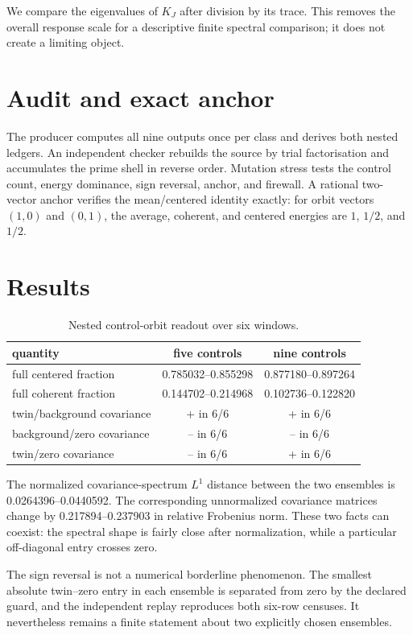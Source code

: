 \documentclass[10pt]{article}
\begin{document}
We compare the eigenvalues of $K_J$ after division by its trace.  This removes
the overall response scale for a descriptive finite spectral comparison; it
does not create a limiting object.

\section{Audit and exact anchor}

The producer computes all nine outputs once per class and derives both nested
ledgers.  An independent checker rebuilds the source by trial factorisation
and accumulates the prime shell in reverse order.  Mutation stress tests the
control count, energy dominance, sign reversal, anchor, and firewall.  A
rational two-vector anchor verifies the mean/centered identity exactly:
for orbit vectors $(1,0)$ and $(0,1)$, the average, coherent, and centered
energies are $1$, $1/2$, and $1/2$.

\section{Results}

\begin{table}[ht]
\centering\small
\caption{Nested control-orbit readout over six windows.}
\label{tab:main}
\begin{tabular}{lcc}
\toprule
quantity & five controls & nine controls\\
\midrule
full centered fraction & 0.785032--0.855298 & 0.877180--0.897264\\
full coherent fraction & 0.144702--0.214968 & 0.102736--0.122820\\
twin/background covariance & + in 6/6 & + in 6/6\\
background/zero covariance & -- in 6/6 & -- in 6/6\\
twin/zero covariance & -- in 6/6 & + in 6/6\\
\bottomrule
\end{tabular}
\end{table}

The normalized covariance-spectrum $L^1$ distance between the two ensembles is
0.0264396--0.0440592.  The corresponding unnormalized covariance matrices
change by 0.217894--0.237903 in relative Frobenius norm.  These two facts can
coexist: the spectral shape is fairly close after normalization, while a
particular off-diagonal entry crosses zero.

The sign reversal is not a numerical borderline phenomenon.  The smallest
absolute twin--zero entry in each ensemble is separated from zero by the
declared guard, and the independent replay reproduces both six-row censuses.
It nevertheless remains a finite statement about two explicitly chosen
ensembles.
\end{document}
